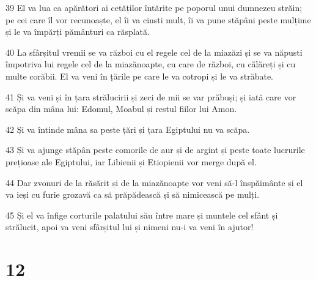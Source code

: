 \par 39 El va lua ca apărători ai cetăților întărite pe poporul unui dumnezeu străin; pe cei care îl vor recunoaște, el îi va cinsti mult, îi va pune stăpâni peste mulțime și le va împărți pământuri ca răsplată.
\par 40 La sfârșitul vremii se va război cu el regele cel de la miazăzi și se va năpusti împotriva lui regele cel de la miazănoapte, cu care de război, cu călăreți și cu multe corăbii. El va veni în țările pe care le va cotropi și le va străbate.
\par 41 Și va veni și în țara strălucirii și zeci de mii se var prăbuși; și iată care vor scăpa din mâna lui: Edomul, Moabul și restul fiilor lui Amon.
\par 42 Și va întinde mâna sa peste țări și țara Egiptului nu va scăpa.
\par 43 Și va ajunge stăpân peste comorile de aur și de argint și peste toate lucrurile prețioase ale Egiptului, iar Libienii și Etiopienii vor merge după el.
\par 44 Dar zvonuri de la răsărit și de la miazănoapte vor veni să-l înspăimânte și el va ieși cu furie grozavă ca să prăpădească și să nimicească pe mulți.
\par 45 Și el va înfige corturile palatului său între mare și muntele cel sfânt și strălucit, apoi va veni sfârșitul lui și nimeni nu-i va veni în ajutor!

\chapter{12}

